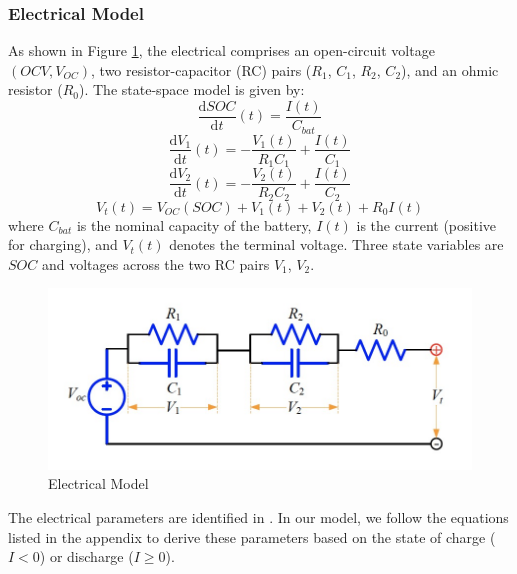 \documentclass[12pt]{article}
\begin{document}
\subsubsection{Electrical Model}
As shown in Figure \ref{p1}, the electrical comprises an open-circuit voltage $(OCV, V_{OC})$, two resistor-capacitor (RC) pairs ($R_1$, $C_1$, $R_2$, $C_2$), and an ohmic resistor ($R_0$). The state-space model is given by:
\begin{equation}
\frac{\mathrm{d} SOC}{\mathrm{d}t}(t) = \frac{I(t)}{C_{bat}}
\end{equation}
\begin{equation}
\frac{\mathrm{d} V_1}{\mathrm{d}t}(t) = -\frac{V_1(t)}{R_1C_1}+\frac{I(t)}{C_1}
\end{equation}
\begin{equation}
\frac{\mathrm{d} V_2}{\mathrm{d}t}(t) = -\frac{V_2(t)}{R_2C_2}+\frac{I(t)}{C_2}
\end{equation}
\begin{equation}
V_t(t) = V_{OC}(SOC)+V_1(t)+V_2(t)+R_0I(t)
\end{equation}
where $C_{bat}$ is the nominal capacity of the battery, $I(t)$ is the current (positive for charging), and $V_t(t)$ denotes the terminal voltage. Three state variables are $SOC$ and voltages across the two RC pairs $V_1$, $V_2$. 
\begin{figure}[H]
	\centering
	\includegraphics[height=0.3\textwidth]{figures/circuit.jpg}
	\caption{Electrical Model \cite{ref:1}}
	\label{p1}
\end{figure}
\noindent The electrical parameters are identified in \cite{ref:2}. In our model, we follow the equations listed in the appendix to derive these parameters based on the state of charge ($I<0$) or discharge ($I\ge 0$).
\end{document}

